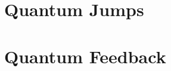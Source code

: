 \documentclass[aps,prl,twocolumn,amsmath,amssymb]{revtex4}
\begin{document}
\section{\label{sec:level1}Quantum Jumps}

\section{\label{sec:level1}Quantum Feedback}







\end{document}
